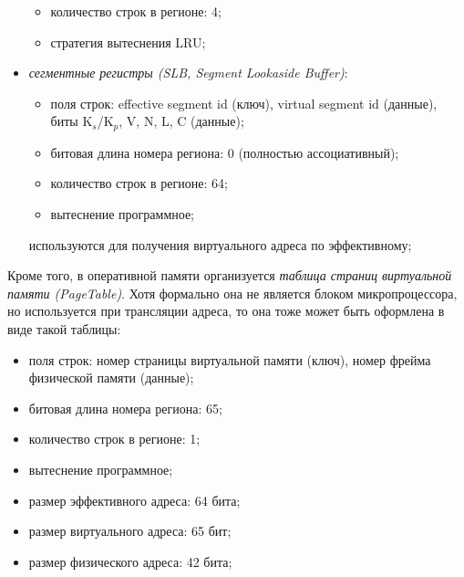 \documentclass[14pt]{extreport}
\newcommand{\LRU}{\textsf{LRU}\xspace}
\newcommand{\FIFO}{\textsf{FIFO}\xspace}
\begin{document}
\begin{itemize}
\begin{itemize}
            \item количество строк в регионе: 4;
            \item стратегия вытеснения \LRU;
        \end{itemize}
  \item \emph{сегментные регистры (SLB, Segment Lookaside Buffer)}:
        \begin{itemize}
            \item поля строк: effective segment id (ключ), virtual segment id (данные), биты K$_s$/K$_p$, V, N, L, C (данные);
            \item битовая длина номера региона: 0 (полностью ассоциативный);
            \item количество строк в регионе: 64;
            \item вытеснение программное;
        \end{itemize}
        используются для получения виртуального адреса по эффективному;
\end{itemize}

Кроме того, в оперативной памяти организуется \emph{таблица страниц виртуальной памяти (PageTable)}. Хотя формально она не является блоком микропроцессора, но используется при трансляции адреса, то она тоже может быть оформлена в виде такой таблицы:
    \begin{itemize}
        \item поля строк: номер страницы виртуальной памяти (ключ), номер фрейма физической памяти (данные);
        \item битовая длина номера региона: 65;
        \item количество строк в регионе: 1;
        \item вытеснение программное;
        \item размер эффективного адреса: 64 бита;
        \item размер виртуального адреса: 65 бит;
        \item размер физического адреса: 42 бита;
    \end{itemize}
\end{document}
